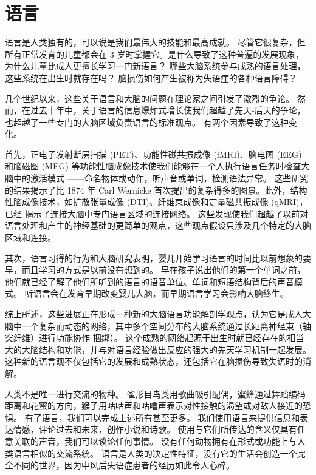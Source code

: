 \chapter{语言} \label{chap:chap55}

语言是人类独有的，可以说是我们最伟大的技能和最高成就。 尽管它很复杂，但所有正常发育的儿童都会在 3 岁时掌握它。是什么导致了这种普遍的发展现象，为什么儿童比成人更擅长学习一门新语言？ 哪些大脑系统参与成熟的语言处理，这些系统在出生时就存在吗？ 脑损伤如何产生被称为失语症的各种语言障碍？

几个世纪以来，这些关于语言和大脑的问题在理论家之间引发了激烈的争论。 然而，在过去十年中，关于语言的信息爆炸式增长使我们超越了先天-后天的争论，也超越了一些专门的大脑区域负责语言的标准观点。 有两个因素导致了这种变化。

首先，正电子发射断层扫描 (PET)、功能性磁共振成像 (fMRI)、脑电图 (EEG) 和脑磁图 (MEG) 等功能性脑成像技术使我们能够在一个人执行语言任务时检查大脑中的激活模式 ——命名物体或动作，听声音或单词，检测语法异常。 这些研究的结果揭示了比 1874 年 Carl Wernicke 首次提出的复杂得多的图景。此外，结构性脑成像技术，如扩散张量成像 (DTI)、纤维束成像和定量磁共振成像 (qMRI)，已经 揭示了连接大脑中专门语言区域的连接网络。 这些发现使我们超越了以前对语言处理和产生的神经基础的更简单的观点，这些观点假设只涉及几个特定的大脑区域和连接。

其次，语言习得的行为和大脑研究表明，婴儿开始学习语言的时间比以前想象的要早，而且学习的方式是以前没有想到的。 早在孩子说出他们的第一个单词之前，他们就已经了解了他们所听到的语言的语音单位、单词和短语结构背后的声音模式。 听语言会在发育早期改变婴儿大脑，而早期语言学习会影响大脑终生。

综上所述，这些进展正在形成一种新的大脑语言功能解剖学观点，认为它是成人大脑中一个复杂而动态的网络，其中多个空间分布的大脑系统通过长距离神经束（轴突纤维）进行功能协作 捆绑）。 这个成熟的网络起源于出生时就已经存在的相当大的大脑结构和功能，并与对语言经验做出反应的强大的先天学习机制一起发展。 这种新的语言观不仅包括它的发展和成熟状态，还包括它在脑损伤导致失语时的消解。

人类不是唯一进行交流的物种。 雀形目鸟类用歌曲吸引配偶，蜜蜂通过舞蹈编码距离和花蜜的方向，猴子用咕咕声和咕噜声表示对性接触的渴望或对敌人接近的恐惧。 有了语言，我们可以完成上述所有甚至更多。 我们使用语言来提供信息和表达情感，评论过去和未来，创作小说和诗歌。 使用与它们所传达的含义仅具有任意关联的声音，我们可以谈论任何事情。 没有任何动物拥有在形式或功能上与人类语言相似的交流系统。 语言是人类的决定性特征，没有它的生活会创造一个完全不同的世界，因为中风后失语症患者的经历如此令人心碎。


